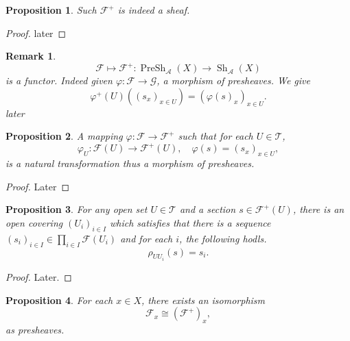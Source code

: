 \documentclass{article}
\newtheorem{proposition}{Proposition}[section]
\newtheorem{remark}{Remark}[section]
\numberwithin{equation}{section}
\DeclareMathOperator{\PreSh}{PreSh}
\DeclareMathOperator{\Sh}{Sh}
\begin{document}
\begin{proposition}
Such $\mathcal{F}^+$ is indeed a sheaf.
\end{proposition}

\begin{proof}
later
\end{proof}

\begin{remark}
\begin{equation*}
\mathcal{F}\mapsto\mathcal{F}^+:\PreSh_\mathcal{A}(X)\to\Sh_\mathcal{A}(X)
\end{equation*}
is a functor. Indeed given $\varphi:\mathcal{F}\to\mathcal{G}$, a morphism of presheaves. We give
\begin{equation*}
\varphi^+(U)((s_x)_{x\in U}) = (\varphi(s)_x)_{x\in U}.
\end{equation*}
later
\end{remark}

\begin{proposition}
A mapping $\varphi:\mathcal{F}\to\mathcal{F}^+$ such that for each $U\in\mathcal{T}$, 
\begin{equation*}
\varphi_U:\mathcal{F}(U)\to\mathcal{F}^+(U),\quad \varphi(s)=(s_x)_{x\in U},
\end{equation*}
is a natural transformation thus a morphism of presheaves.
\end{proposition}

\begin{proof}
Later
\end{proof}

\begin{proposition}
\label{section_rep}
For any open set $U\in\mathcal{T}$ and a section $s\in\mathcal{F}^+(U)$, there is an open covering $(U_i)_{i\in I}$ which satisfies that there is a sequence $(s_i)_{i\in I}\in\prod_{i\in I}\mathcal{F}(U_i)$ and for each $i$, the following hodls.
\begin{equation*}
\rho_{UU_i}(s)=s_i.
\end{equation*}
\end{proposition}
\begin{proof}
Later.
\end{proof}

\begin{proposition}
For each $x\in X$, there exists an isomorphism
\begin{equation*}
\mathcal{F}_x\cong (\mathcal{F}^+)_x,
\end{equation*}
as presheaves.
\end{proposition}
\end{document}
